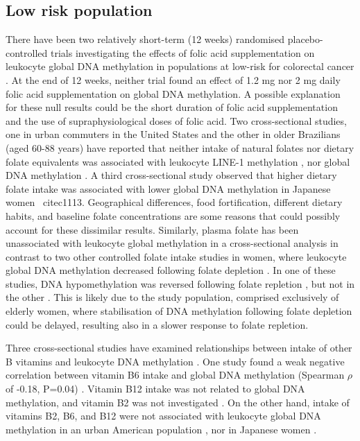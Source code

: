 \subsection{Low risk population} %
\noindent There have been two relatively short-term (12 weeks) randomised placebo-controlled trials investigating the effects of folic acid supplementation on leukocyte global DNA methylation in populations at low-risk for colorectal cancer \cite{c1109,c1110}. At the end of 12 weeks, neither trial found an effect of 1.2 mg \cite{c1109} nor 2 mg \cite{c1110} daily folic acid supplementation on global DNA methylation. A possible explanation for these null results could be the short duration of folic acid supplementation and the use of supraphysiological doses of folic acid. Two cross-sectional studies, one in urban commuters in the United States and the other in older Brazilians (aged 60-88 years) have reported that neither intake of natural folates nor dietary folate equivalents was associated with leukocyte LINE-1 methylation \cite{c1111}, nor global DNA methylation \cite{c1112}. A third cross-sectional study observed that higher dietary folate intake was associated with lower global DNA methylation in 
Japanese women \
cite{c1113}. Geographical differences, food fortification, different dietary habits, and baseline folate concentrations are some reasons that could possibly account for these dissimilar results. Similarly, plasma folate has been unassociated with leukocyte global methylation in a cross-sectional analysis \cite{c1114} in contrast to two other controlled folate intake studies in women, where leukocyte global DNA methylation decreased following folate depletion \cite{c1115,c1116}. In one of these studies, DNA hypomethylation was reversed following folate repletion \cite{c1115}, but not in the other \cite{c1116}. This is likely due to the study population, comprised exclusively of elderly women, where stabilisation of DNA methylation following folate depletion could be delayed, resulting also in a slower response to folate repletion. 

\noindent Three cross-sectional studies have examined relationships between intake of other B vitamins and leukocyte DNA methylation \cite{c1111,c1112,c1113}. One study found a weak negative correlation between vitamin B6 intake and global DNA methylation (Spearman $\rho$ of -0.18, P=0.04) \cite{c1112}. Vitamin B12 intake was not related to global DNA methylation, and vitamin B2 was not investigated \cite{c1112}. On the other hand, intake of vitamins B2, B6, and B12 were not associated with leukocyte global DNA methylation in an urban American population \cite{c1111}, nor in Japanese women \cite{c1113}. 
 
